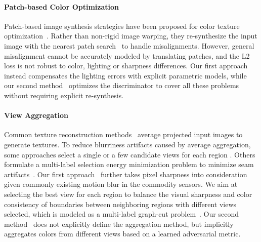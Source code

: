 \paragraph*{Patch-based Color Optimization}
Patch-based image synthesis strategies have been proposed for color texture optimization~\cite{bi2017patch}. Rather than non-rigid image warping, they re-synthesize the input image with the nearest patch search~\cite{simakov2008summarizing} to handle misalignments. 
However, general misalignment cannot be accurately modeled by translating patches, and the L2 loss is not robust to color, lighting or sharpness differences. Our first approach~\cite{huang20173dlite} instead compensates the lighting errors with explicit parametric models, while our second method~\cite{huang2020adversarial} optimizes the discriminator to cover all these problems without requiring explicit re-synthesis.

\paragraph*{View Aggregation} Common texture reconstruction methods~\cite{izadi2011kinectfusion,zhou2014color} average projected input images to generate textures.  
To reduce blurriness artifacts caused by average aggregation, some approaches select a single or a few candidate views for each region \cite{dessein2014seamless}. Others formulate a multi-label selection energy minimization problem to minimize seam artifacts~\cite{lempitsky2007seamless,sinha2008interactive,velho2007projective,waechter2014let}. Our first approach~\cite{huang20173dlite} further takes pixel sharpness into consideration given commonly existing motion blur in the commodity sensors. We aim at selecting the best view for each region to balance the visual sharpness and color consistency of boundaries between neighboring regions with different views selected, which is modeled as a multi-label graph-cut problem~\cite{boykov2001fast}. Our second method~\cite{huang2020adversarial} does not explicitly define the aggregation method, but implicitly aggregates colors from different views based on a learned adversarial metric.

